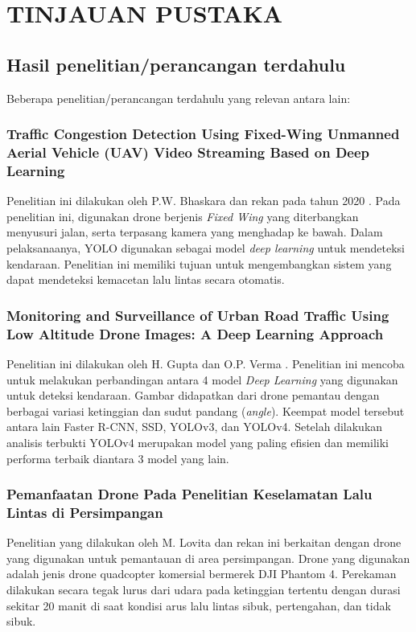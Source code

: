 \chapter{TINJAUAN PUSTAKA}

\section{Hasil penelitian/perancangan terdahulu}
Beberapa penelitian/perancangan terdahulu yang relevan antara lain:

\subsection{Traffic Congestion Detection Using Fixed-Wing Unmanned Aerial Vehicle (UAV) Video Streaming Based on Deep Learning}
Penelitian ini dilakukan oleh P.W. Bhaskara dan rekan pada tahun 2020 \cite{WisnuFWDeepLearning}. Pada penelitian ini, digunakan drone berjenis \emph{Fixed Wing} yang diterbangkan menyusuri jalan, serta terpasang kamera yang menghadap ke bawah. Dalam pelaksanaanya, YOLO digunakan sebagai model \emph{deep learning} untuk mendeteksi kendaraan. Penelitian ini memiliki tujuan untuk mengembangkan sistem yang dapat mendeteksi kemacetan lalu lintas secara otomatis.

\subsection{Monitoring and Surveillance of Urban Road Traffic Using Low Altitude Drone Images: A Deep Learning Approach}
Penelitian ini dilakukan oleh H. Gupta dan O.P. Verma \cite{GuptaSurveillanceDrone}. Penelitian ini mencoba untuk melakukan perbandingan antara 4 model \emph{Deep Learning} yang digunakan untuk deteksi kendaraan. Gambar didapatkan dari drone pemantau dengan berbagai variasi ketinggian dan sudut pandang (\emph{angle}). Keempat model tersebut antara lain Faster R-CNN, SSD, YOLOv3, dan YOLOv4. Setelah dilakukan analisis terbukti YOLOv4 merupakan model yang paling efisien dan memiliki performa terbaik diantara 3 model yang lain.

\subsection{Pemanfaatan Drone Pada Penelitian Keselamatan Lalu Lintas di Persimpangan}
Penelitian yang dilakukan oleh M. Lovita dan rekan \cite{LovitaACEConference} ini berkaitan dengan drone yang digunakan untuk pemantauan di area persimpangan. Drone yang digunakan adalah jenis drone quadcopter komersial bermerek DJI Phantom 4. Perekaman dilakukan secara tegak lurus dari udara pada ketinggian tertentu dengan durasi sekitar 20 manit di saat kondisi arus lalu lintas sibuk, pertengahan, dan tidak sibuk.

